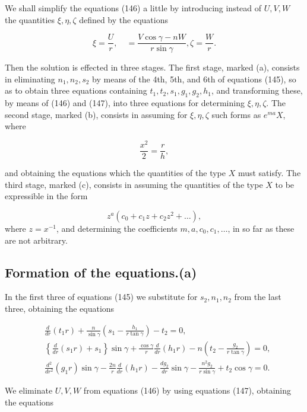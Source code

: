 We shall simplify the equations (146) a little by introducing instead of
\(U, V, W\) the quantities \(\xi, \eta, \zeta\) defined by the equations

\[\xi=\frac{U}{r}, \quad=\frac{V \cos \gamma-n W}{r \sin \gamma}, \zeta=\frac{W}{r} .\]

Then the solution is effected in three stages. The first stage, marked
(a), consists in eliminating \(n_1, n_2, s_2\) by means of the 4th, 5th,
and 6th of equations (145), so as to obtain three equations containing
\(t_1, t_2, s_1, g_1, g_2, h_1\), and transforming these, by means of
(146) and (147), into three equations for determining
\(\xi, \eta, \zeta\). The second stage, marked (b), consists in assuming
for \(\xi, \eta, \zeta\) such forms as \(e^{m a} X\), where

\[\frac{x^2}{2}=\frac{r}{h},\]


and obtaining the equations which the quantities of the type \(X\) must
satisfy. The third stage, marked (c), consists in assuming the
quantities of the type \(X\) to be expressible in the form

\[z^a\left(c_0+c_1 z+c_2 z^2+\ldots\right),\]
where \(z=x^{-1}\), and determining the coefficients
\(m, a, c_0, c_1, \ldots\), in so far as these are not arbitrary.

\subsection{Formation of the equations.(a)}

In the first three of equations (145) we substitute for
\(s_2, n_1, n_2\) from the last three, obtaining the equations

\[\begin{aligned}
& \frac{d}{d r}\left(t_1 r\right)+\frac{n}{\sin \gamma}\left(s_1-\frac{h_1}{r \tan \gamma}\right)-t_2=0, \\
& \left\{\frac{d}{d r}\left(s_1 r\right)+s_1\right\} \sin \gamma+\frac{\cos \gamma}{r} \frac{d}{d r}\left(h_1 r\right)-n\left(t_2-\frac{g_2}{r \tan \gamma}\right)=0, \\
& \frac{d^2}{d r^2}\left(g_1 r\right) \sin \gamma-\frac{2 n}{r} \frac{d}{d r}\left(h_1 r\right)-\frac{d g_2}{d r} \sin \gamma-\frac{n^2 g_2}{r \sin \gamma}+t_2 \cos \gamma=0 .
\end{aligned}\]

We eliminate \(U, V, W\) from equations (146) by using equations (147),
obtaining the equations

